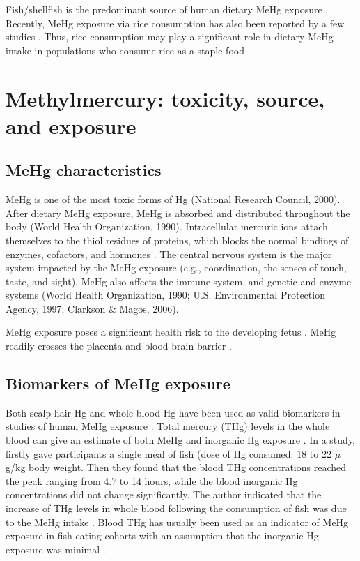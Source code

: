 Fish/shellfish is the predominant source of human dietary MeHg exposure \citep{who1990mehg,usepa1997hgcongress,clarkson2006toxicology}. Recently, MeHg exposure via rice consumption has also been reported by a few studies \citep{feng2007human,rothenberg2011low,li2012rice,davis2014dietary}. Thus, rice consumption may play a significant role in dietary MeHg intake in populations who consume rice as a staple food \citep{rothenberg2011low,rothenberg2013prenatal,rothenberg2014rice}.

\section{Methylmercury: toxicity, source, and exposure}

\subsection{MeHg characteristics}

MeHg is one of the most toxic forms of Hg (National Research Council, 2000). After dietary MeHg exposure, MeHg is absorbed and distributed throughout the body (World Health Organization, 1990). Intracellular mercuric ions attach themselves to the thiol residues of proteins, which blocks the normal bindings of enzymes, cofactors, and hormones \citep{bridges2005molecular}. The central nervous system is the major system impacted by the MeHg exposure (e.g., coordination, the senses of touch, taste, and sight). MeHg also affects the immune system, and genetic and enzyme systems (World Health Organization, 1990; U.S. Environmental Protection Agency, 1997; Clarkson \& Magos, 2006). 

MeHg exposure poses a significant health risk to the developing fetus \citep{clarkson2006toxicology, mergler2007methylmercury,grandjean2010adverse,bose2010mercury}. MeHg readily crosses the placenta and blood-brain barrier \citep{cernichiari1994biological,ramirez2000tagum}. 

\subsection{Biomarkers of MeHg exposure}

Both scalp hair Hg and whole blood Hg have been used as valid biomarkers in studies of human MeHg exposure \citep{clarkson2006toxicology,mergler2007methylmercury}. Total mercury (THg) levels in the whole blood can give an estimate of both MeHg and inorganic Hg exposure \citep{kershaw1980relationship,berglund2005inter,clarkson2006toxicology}. In a study, \cite{kershaw1980relationship} firstly gave participants a single meal of fish (dose of Hg consumed: 18 to 22 \({\mu}\)g/kg body weight. Then they found that the blood THg concentrations reached the peak ranging from 4.7 to 14 hours, while the blood inorganic Hg concentrations did not change significantly. The author indicated that the increase of THg levels in whole blood following the consumption of fish was due to the MeHg intake \citep{kershaw1980relationship}. Blood THg has usually been used as an indicator of MeHg exposure in fish-eating cohorts with an assumption that the inorganic Hg exposure was minimal \citep{schober2003blood,weil2005blood}.

